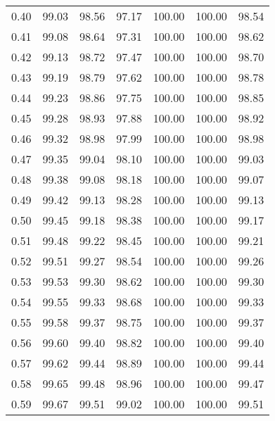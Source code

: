 \begin{tabular}{|c|c|c|c|c|c|c|}
      0.40 &     99.03 &     98.56 &      97.17 &  100.00 &     100.00 &         98.54 \\
      0.41 &     99.08 &     98.64 &      97.31 &  100.00 &     100.00 &         98.62 \\
      0.42 &     99.13 &     98.72 &      97.47 &  100.00 &     100.00 &         98.70 \\
      0.43 &     99.19 &     98.79 &      97.62 &  100.00 &     100.00 &         98.78 \\
      0.44 &     99.23 &     98.86 &      97.75 &  100.00 &     100.00 &         98.85 \\
      0.45 &     99.28 &     98.93 &      97.88 &  100.00 &     100.00 &         98.92 \\
      0.46 &     99.32 &     98.98 &      97.99 &  100.00 &     100.00 &         98.98 \\
      0.47 &     99.35 &     99.04 &      98.10 &  100.00 &     100.00 &         99.03 \\
      0.48 &     99.38 &     99.08 &      98.18 &  100.00 &     100.00 &         99.07 \\
      0.49 &     99.42 &     99.13 &      98.28 &  100.00 &     100.00 &         99.13 \\
      0.50 &     99.45 &     99.18 &      98.38 &  100.00 &     100.00 &         99.17 \\
      0.51 &     99.48 &     99.22 &      98.45 &  100.00 &     100.00 &         99.21 \\
      0.52 &     99.51 &     99.27 &      98.54 &  100.00 &     100.00 &         99.26 \\
      0.53 &     99.53 &     99.30 &      98.62 &  100.00 &     100.00 &         99.30 \\
      0.54 &     99.55 &     99.33 &      98.68 &  100.00 &     100.00 &         99.33 \\
      0.55 &     99.58 &     99.37 &      98.75 &  100.00 &     100.00 &         99.37 \\
      0.56 &     99.60 &     99.40 &      98.82 &  100.00 &     100.00 &         99.40 \\
      0.57 &     99.62 &     99.44 &      98.89 &  100.00 &     100.00 &         99.44 \\
      0.58 &     99.65 &     99.48 &      98.96 &  100.00 &     100.00 &         99.47 \\
      0.59 &     99.67 &     99.51 &      99.02 &  100.00 &     100.00 &         99.51 \\

\end{tabular}
